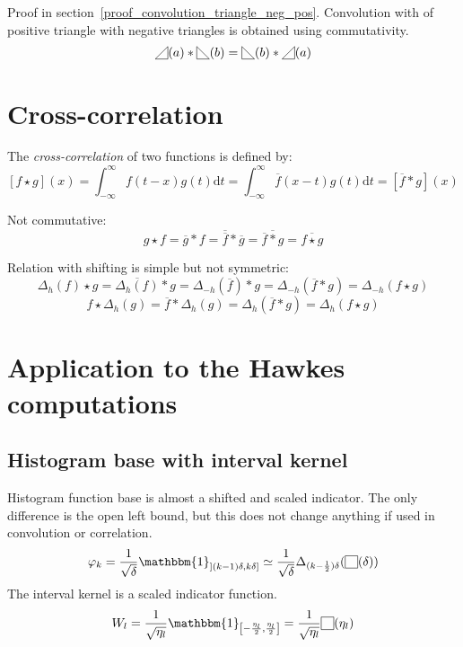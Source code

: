 \documentclass[a4paper,10pt]{article}
\newcommand\Shifted[2]{\Delta_{#1}(#2)}
\newcommand\Reversed[1]{\overline{#1}} %
\newcommand\SymSquare{\begin{tikzpicture}[baseline=0.5ex]%
        \draw (0,0) -- (0,1em) -- (1em,1em) -- (1em,0) -- cycle;
\end{tikzpicture}}
\newcommand\Indicator[1]{\SymSquare(#1)}
\newcommand\SymPositiveTriangle{\begin{tikzpicture}[baseline=0.5ex]%
        \draw (0,0) -- (1em,0em) -- (1em,1em) -- cycle;
\end{tikzpicture}}
\newcommand\PositiveTriangle[1]{\SymPositiveTriangle(#1)}
\newcommand\SymNegativeTriangle{\begin{tikzpicture}[baseline=0.5ex]%
        \draw (0,0) -- (0,1em) -- (1em,0em) -- cycle;
\end{tikzpicture}}
\newcommand\NegativeTriangle[1]{\SymNegativeTriangle(#1)}
\newcommand\D{\mathrm{d}}
\newcommand\Convolution{\ast}
\newcommand\Correlation{\star}
\newcommand\IntR[2]{\int_{-\infty}^{\infty}#1 \D#2}
\begin{document}
Proof in section~\ref{proof_convolution_triangle_neg_pos}.
Convolution with of positive triangle with negative triangles is obtained using commutativity.
\[ \PositiveTriangle{a} \Convolution \NegativeTriangle{b} = \NegativeTriangle {b} \Convolution \PositiveTriangle{a} \]

\section{Cross-correlation}
The \emph{cross-correlation} of two functions is defined by:
\[ \left[ f \Correlation g \right] (x) = \IntR{f(t-x) g(t)}{t} = \IntR{\Reversed{f}(x-t) g(t)}{t} = \left[ \Reversed{f} \Convolution g \right] (x) \]

Not commutative:
\[
    g \Correlation f = \Reversed{g} \Convolution f = \Reversed{\Reversed{f}} \Convolution \Reversed{g} =
    \Reversed{\Reversed{f} \Convolution g} = \Reversed{f \Correlation g}
\]

Relation with shifting is simple but not symmetric:
\[
    \Shifted{h}{f} \Correlation g = \Reversed{\Shifted{h}{f}} \Convolution g = \Shifted{-h}{\Reversed{f}} \Convolution g =
    \Shifted{-h}{\Reversed{f} \Convolution g} = \Shifted{-h}{f \Correlation g}
\]
\[ f \Correlation \Shifted{h}{g} = \Reversed{f} \Convolution \Shifted{h}{g} = \Shifted{h}{\Reversed{f} \Convolution g} = \Shifted{h}{f \Correlation g} \]

\section{Application to the Hawkes computations}

\subsection{Histogram base with interval kernel}
Histogram function base is almost a shifted and scaled indicator.
The only difference is the open left bound, but this does not change anything if used in convolution or correlation.
\[
    \varphi_k =
    \frac{1}{\sqrt{\delta}} \mathbbm{1}_{\left] (k-1)\delta, k\delta \right]} \simeq
    \frac{1}{\sqrt{\delta}} \Shifted{(k-\frac{1}{2})\delta}{\Indicator{\delta}}
\]
The interval kernel is a scaled indicator function.
\[ W_l = \frac{1}{\sqrt{\eta_l}} \mathbbm{1}_{\left[ -\frac{\eta_l}{2}, \frac{\eta_l}{2} \right]} = \frac{1}{\sqrt{\eta_l}} \Indicator{\eta_l} \]
\end{document}
